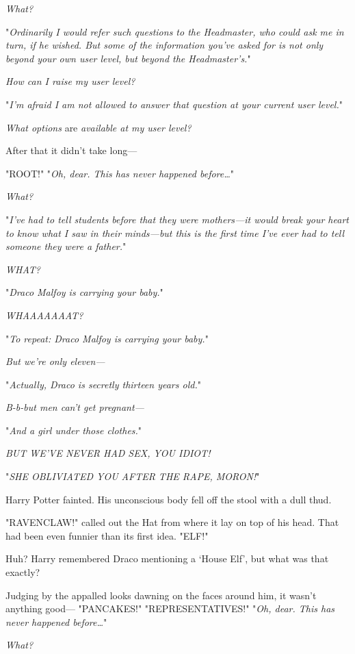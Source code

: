 \emph{What?}

"\emph{Ordinarily I would refer such questions to the Headmaster, who could ask 
me in turn, if he wished. But some of the information you've asked for is not 
only beyond your own user level, but beyond the Headmaster's.}"

\emph{How can I raise my user level?}

"\emph{I'm afraid I am not allowed to answer that question at your current user 
level.}"

\emph{What options} are \emph{available at my user level?}

After that it didn't take long---

"ROOT!"
\sbreak
"\emph{Oh, dear. This has never happened before{\ldots}}"

\emph{What?}

"\emph{I've had to tell students before that they were mothers---it would break 
your heart to know what I saw in their minds---but this is the first time I've 
ever had to tell someone they were a father.}"

\emph{WHAT?}

"\emph{Draco Malfoy is carrying your baby.}"

\emph{WHAAAAAAAT?}

"\emph{To repeat: Draco Malfoy is carrying your baby.}"

\emph{But we're only eleven---}

"\emph{Actually, Draco is secretly thirteen years old.}"

\emph{B-b-but men can't get pregnant---}

"\emph{And a girl under those clothes.}"

\emph{BUT WE'VE NEVER HAD SEX, YOU IDIOT!}

"\emph{SHE OBLIVIATED YOU AFTER THE RAPE, MORON!}"

Harry Potter fainted. His unconscious body fell off the stool with a dull thud.

"RAVENCLAW!" called out the Hat from where it lay on top of his head. That had 
been even funnier than its first idea.
\sbreak
"ELF!"

Huh? Harry remembered Draco mentioning a `House Elf', but what was that exactly?

Judging by the appalled looks dawning on the faces around him, it wasn't 
anything good---
\sbreak
"PANCAKES!"
\sbreak
"REPRESENTATIVES!"
\sbreak
"\emph{Oh, dear. This has never happened before{\ldots}}"

\emph{What?}

